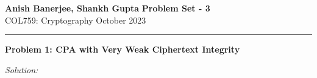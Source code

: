 \documentclass[a4paper, 11pt]{article}
\newcommand{\hr}{\noindent\rule{7in}{2.8pt}}
\newenvironment{solution}
    {\textit{Solution:}}
    {\clearpage}
\newcommand{\prob}[1]{\begin{mdframed}[backgroundcolor=gray!20] \textbf{Problem #1}\end{mdframed}}
\begin{document}
\newtheorem*{claim}[theorem]{Claim}
\newenvironment{fclaim}
{\colorlet{shadecolor}{red!20}\begin{shaded}\begin{claim}}
            {\end{claim}\end{shaded}}

\noindent
\large\textbf{Anish Banerjee, Shankh Gupta} \hfill \textbf{Problem Set - 3}   \\
\normalsize COL759: Cryptography \hfill October 2023\\
\hr


\prob{1: CPA with Very Weak Ciphertext Integrity}
\begin{solution}

\end{solution}
\end{document}
